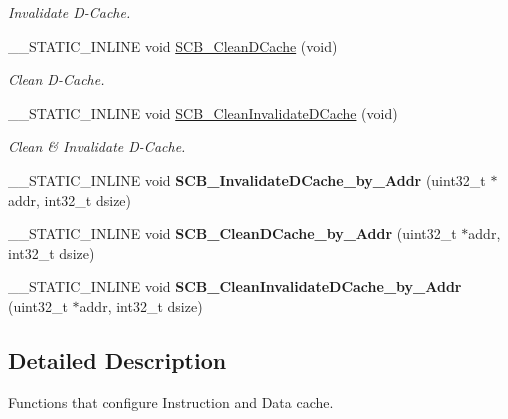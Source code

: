 \begin{DoxyCompactItemize}
\begin{DoxyCompactList}\small\item\em Invalidate D-\/\+Cache. \end{DoxyCompactList}\item 
\+\_\+\+\_\+\+S\+T\+A\+T\+I\+C\+\_\+\+I\+N\+L\+I\+NE void \hyperlink{group__CMSIS__Core__CacheFunctions_ga55583e3065c6eabca204b8b89b121c4c}{S\+C\+B\+\_\+\+Clean\+D\+Cache} (void)
\begin{DoxyCompactList}\small\item\em Clean D-\/\+Cache. \end{DoxyCompactList}\item 
\+\_\+\+\_\+\+S\+T\+A\+T\+I\+C\+\_\+\+I\+N\+L\+I\+NE void \hyperlink{group__CMSIS__Core__CacheFunctions_ga1b741def9e3b2ca97dc9ea49b8ce505c}{S\+C\+B\+\_\+\+Clean\+Invalidate\+D\+Cache} (void)
\begin{DoxyCompactList}\small\item\em Clean \& Invalidate D-\/\+Cache. \end{DoxyCompactList}\item 
\+\_\+\+\_\+\+S\+T\+A\+T\+I\+C\+\_\+\+I\+N\+L\+I\+NE void {\bfseries S\+C\+B\+\_\+\+Invalidate\+D\+Cache\+\_\+by\+\_\+\+Addr} (uint32\+\_\+t $\ast$addr, int32\+\_\+t dsize)\hypertarget{group__CMSIS__Core__CacheFunctions_ga503ef7ef58c0773defd15a82f6336c09}{}\label{group__CMSIS__Core__CacheFunctions_ga503ef7ef58c0773defd15a82f6336c09}

\item 
\+\_\+\+\_\+\+S\+T\+A\+T\+I\+C\+\_\+\+I\+N\+L\+I\+NE void {\bfseries S\+C\+B\+\_\+\+Clean\+D\+Cache\+\_\+by\+\_\+\+Addr} (uint32\+\_\+t $\ast$addr, int32\+\_\+t dsize)\hypertarget{group__CMSIS__Core__CacheFunctions_ga696fadbf7b9cc71dad42fab61873a40d}{}\label{group__CMSIS__Core__CacheFunctions_ga696fadbf7b9cc71dad42fab61873a40d}

\item 
\+\_\+\+\_\+\+S\+T\+A\+T\+I\+C\+\_\+\+I\+N\+L\+I\+NE void {\bfseries S\+C\+B\+\_\+\+Clean\+Invalidate\+D\+Cache\+\_\+by\+\_\+\+Addr} (uint32\+\_\+t $\ast$addr, int32\+\_\+t dsize)\hypertarget{group__CMSIS__Core__CacheFunctions_ga630131b2572eaa16b569ed364dfc895e}{}\label{group__CMSIS__Core__CacheFunctions_ga630131b2572eaa16b569ed364dfc895e}

\end{DoxyCompactItemize}


\subsection{Detailed Description}
Functions that configure Instruction and Data cache. 



